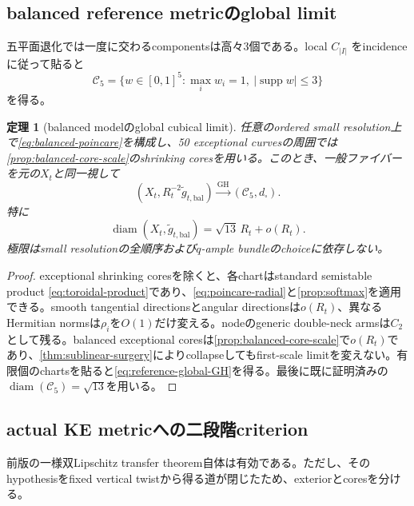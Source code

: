\documentclass[11pt,a4paper]{ltjsarticle}
\newtheorem{theorem}{定理}[section]
\theoremstyle{definition}
\theoremstyle{remark}
\newcommand{\diam}{\operatorname{diam}}
\newcommand{\GH}{\mathrm{GH}}
\newcommand{\supp}{\operatorname{supp}}
\begin{document}
\subsection{balanced reference metricのglobal limit}

五平面退化では一度に交わるcomponentsは高々3個である。local $C_{|I|}$ をincidenceに従って貼ると
\begin{equation}\label{eq:C5maxsupport}
 \mathcal C_5
 =\{w\in[0,1]^5:\max_iw_i=1,\ |\supp w|\le3\}
\end{equation}
を得る。

\begin{theorem}[balanced modelのglobal cubical limit]\label{prop:reference-global}
任意のordered small resolution上で\eqref{eq:balanced-poincare}を構成し、50 exceptional curvesの周囲では\cref{prop:balanced-core-scale}のshrinking coresを用いる。このとき、一般ファイバーを元の$X_t$と同一視して
\begin{equation}\label{eq:reference-global-GH}
 (X_t,R_t^{-2}\widetilde g_{t,\mathrm{bal}})
 \xrightarrow{\GH}(\mathcal C_5,d_\square).
\end{equation}
特に
\begin{equation}\label{eq:reference-diameter}
 \diam(X_t,\widetilde g_{t,\mathrm{bal}})
 =\sqrt{13}\,R_t+o(R_t).
\end{equation}
極限はsmall resolutionの全順序および$q$-ample bundleのchoiceに依存しない。
\end{theorem}

\begin{proof}
exceptional shrinking coresを除くと、各chartはstandard semistable product \eqref{eq:toroidal-product}であり、\eqref{eq:poincare-radial}と\cref{prop:softmax}を適用できる。smooth tangential directionsとangular directionsは$o(R_t)$、異なるHermitian normsは$\rho_i$を$O(1)$だけ変える。nodeのgeneric double-neck armsは$C_2$として残る。balanced exceptional coresは\cref{prop:balanced-core-scale}で$o(R_t)$であり、\cref{thm:sublinear-surgery}によりcollapseしてもfirst-scale limitを変えない。有限個のchartsを貼ると\eqref{eq:reference-global-GH}を得る。最後に既に証明済みの
$\diam(\mathcal C_5)=\sqrt{13}$を用いる。
\end{proof}

\subsection{actual KE metricへの二段階criterion}

前版の一様双Lipschitz transfer theorem自体は有効である。ただし、そのhypothesisをfixed vertical twistから得る道が閉じたため、exteriorとcoresを分ける。
\end{document}
